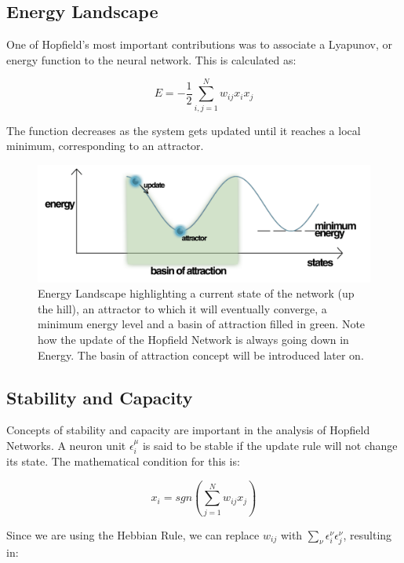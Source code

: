 \subsection{Energy Landscape}

One of Hopfield's most important contributions was to associate a Lyapunov, or energy function to the neural network. This is calculated as:

\[ E = -\frac{1}{2} \sum_{i,j=1}^{N}w_{ij}x_{i}x_{j} \]

The function decreases as the system gets updated until it reaches a local minimum, corresponding to an attractor.


\begin{figure}[h]
  \centering
\includegraphics[scale=0.25]{energy_landscape.png}
\caption{Energy Landscape highlighting a current state of the network (up the hill), an attractor to which it will eventually converge, a minimum energy level and a basin of attraction filled in green. Note how the update of the Hopfield Network is always going down in Energy. The basin of attraction concept will be introduced later on.}
\label{fig:energy_landscape}
\end{figure}



\subsection{Stability and Capacity}

Concepts of stability and capacity are important in the analysis of Hopfield Networks. A neuron unit \( \epsilon_{i}^{\mu}\) is said to be stable if the update rule will not change its state. The mathematical condition for this is:

 \[x_{i} = sgn(\sum_{j=1}^{N}w_{ij}x_{j}) \]

Since we are using the Hebbian Rule, we can replace \(w_{ij}\) with
\(\sum_{\nu}\epsilon_{i}^{\nu}\epsilon_{j}^{\nu}\), resulting in:

